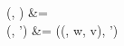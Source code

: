 \entries(\delta, \varepsilon) &{}= \delta \\
\entries(\delta,  \cons \delta') &{}= \entries(\update(\delta, w, v), \delta')
